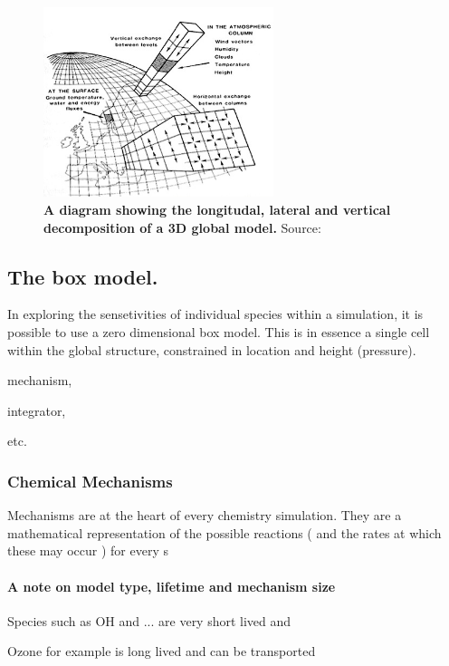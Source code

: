 \begin{figure}
  \centering
  \includegraphics[width=0.6\textwidth]{gcm.jpg}
  \caption{\textbf{A diagram showing the longitudal, lateral and vertical decomposition of a 3D global model.} Source: \citep{gcm}}
  \label{fig:gcm}
\end{figure}


\subsection{The box model.}
In exploring the sensetivities of individual species within a simulation, it is possible to use a zero dimensional box model. This is in essence a single cell within the global structure, constrained in location and height (pressure).



mechanism,

integrator,

etc.






\subsubsection{Chemical Mechanisms}
Mechanisms are at the heart of every chemistry simulation. They are a mathematical representation of the possible reactions ( and the rates at which these may occur ) for every s



\paragraph{A note on model type, lifetime and mechanism size}
Species such as OH and ... are very short lived and

Ozone for example is long lived and can be transported




